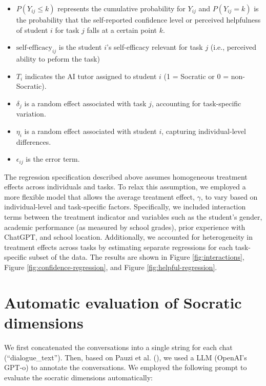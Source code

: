\documentclass[
  11pt,
]{article}
\begin{document}
\begin{itemize}
\item
  \(P(Y_{ij} \leq k)\) represents the cumulative probability for \(Y_{ij}\) and \(P(Y_{ij} = k)\) is the probability that the self-reported confidence level or perceived helpfulness of student \(i\) for task \(j\) falls at a certain point \(k\).
\item
  \(\text{self-efficacy}_{ij}\) is the student \(i\)'s self-efficacy relevant for task \(j\) (i.e., perceived ability to peform the task)
\item
  \(T_i\) indicates the AI tutor assigned to student \(i\) (1 = Socratic or 0 = non-Socratic).
\item
  \(\delta_j\) is a random effect associated with task \(j\), accounting for task-specific variation.
\item
  \(\eta_i\) is a random effect associated with student \(i\), capturing individual-level differences.
\item
  \(\epsilon_{ij}\) is the error term.
\end{itemize}

The regression specification described above assumes homogeneous treatment effects across individuals and tasks. To relax this assumption, we employed a more flexible model that allows the average treatment effect, \(\gamma\), to vary based on individual-level and task-specific factors. Specifically, we included interaction terms between the treatment indicator and variables such as the student's gender, academic performance (as measured by school grades), prior experience with ChatGPT, and school location. Additionally, we accounted for heterogeneity in treatment effects across tasks by estimating separate regressions for each task-specific subset of the data. The results are shown in Figure \ref{fig:interactions}, Figure \ref{fig:confidence-regression}, and Figure \ref{fig:helpful-regression}.

\section{Automatic evaluation of Socratic dimensions}\label{sec:socratic-dimension}

We first concatenated the conversations into a single string for each chat (``dialogue\_text''). Then, based on Pauzi et al. (), we used a LLM (OpenAI's GPT-o) to annotate the conversations. We employed the following prompt to evaluate the socratic dimensions automatically:
\end{document}

